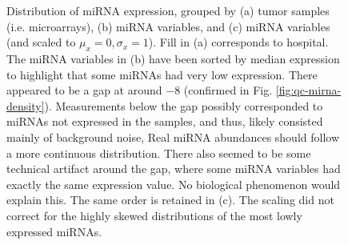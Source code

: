 \begin{figure}
	\centering
	\begin{subfigure}{1\textwidth}
		\centering
	\end{subfigure}
	\begin{subfigure}{1\textwidth}
		\centering
	\end{subfigure}
	\begin{subfigure}{1\textwidth}
		\centering
	\end{subfigure}

	\caption{Distribution of miRNA expression, grouped by
	(a) tumor samples (i.e. microarrays),
	(b) miRNA variables, 
	and (c) miRNA variables (and scaled to $\mu_x = 0, \sigma_x = 1$).
	Fill in (a) corresponds to hospital.
	The miRNA variables in (b) have been sorted by median expression to highlight that
	some miRNAs had very low expression. There appeared to be a gap at around $-8$
	(confirmed in Fig. \ref{fig:qc-mirna-density}). Measurements below the gap possibly corresponded
	to miRNAs not expressed in the samples, and thus, likely consisted
	mainly of background noise, Real miRNA abundances should follow a more continuous distribution.
	There also seemed to be some technical artifact around the gap, where some miRNA variables had
	exactly the same expression value. No biological phenomenon would explain this.
	The same order is retained in (c). The scaling did not
	correct for the highly skewed distributions of the most lowly expressed miRNAs.}
	\label{fig:qc-mirna-boxplot}
\end{figure}


